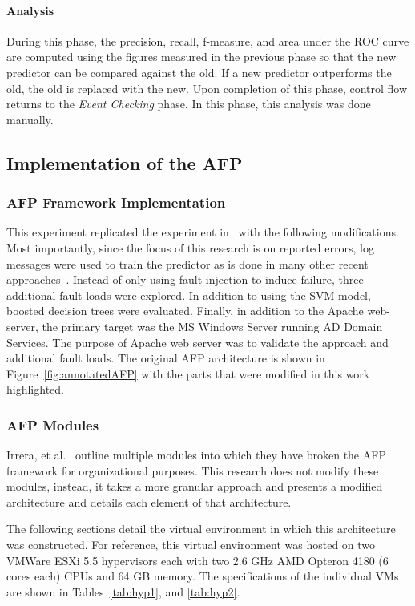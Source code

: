 \paragraph{Analysis}
During this phase, the precision, recall, f-measure, and area under the
\ac{ROC} curve are computed using the figures measured in the previous phase so
that the new predictor can be compared against the old.  If a new predictor
outperforms the old, the old is replaced with the new.  Upon completion of this
phase, control flow returns to the \emph{Event Checking} phase.  In this phase,
this analysis was done manually.

\subsection{Implementation of the \ac{AFP}} \label{sec:implementation}
\subsubsection{\ac{AFP} Framework Implementation}
This experiment replicated the experiment in~\cite{irrera2015} with the
following modifications.  Most importantly, since the focus of this research is
on reported errors, log messages were used to train the predictor as is done in
many other recent
approaches~\cite{domeniconi2002,fulp2008,salfner2007,watanabe2014}.  Instead of
only using fault injection to induce failure, three additional fault loads were
explored.  In addition to using the \ac{SVM} model, boosted decision trees were
evaluated.  Finally, in addition to the Apache web-server, the primary target
was the \ac{MS} Windows Server running \ac{AD} Domain Services.  The purpose of
Apache web server was to validate the approach and additional fault loads.  The
original \ac{AFP} architecture is shown in Figure~\ref{fig:annotatedAFP} with
the parts that were modified in this work highlighted.  

\subsubsection{\ac{AFP} Modules}
Irrera, et al.~\cite{irrera2015} outline multiple modules into which they have
broken the \ac{AFP} framework for organizational purposes.  This research does
not modify these modules, instead, it takes a more granular approach and
presents a modified architecture and details each element of that architecture.

\figannotatedAFP  

The following sections detail the virtual environment in which this
architecture was constructed.  For reference, this virtual environment was
hosted on two VMWare ESXi 5.5 hypervisors each with two 2.6 \ac{GHz} AMD
Opteron 4180 (6 cores each) \ac{CPU}s and 64 \ac{GB} memory.  The
specifications of the individual \ac{VM}s are shown in Tables~\ref{tab:hyp1},
and \ref{tab:hyp2}.

